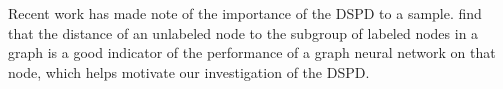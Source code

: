 Recent work has made note of the importance of the DSPD to a sample. \citet{ma2021subgroup} find that the distance of an unlabeled node to the subgroup of labeled nodes in a graph is a good indicator of the performance of a graph neural network on that node, which helps motivate our investigation of the DSPD.
